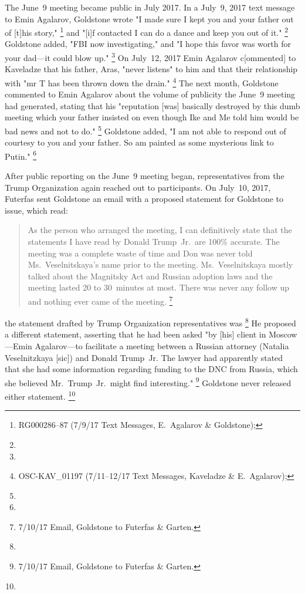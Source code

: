 The June~9 meeting became public in July 2017.
In a July~9, 2017 text message to Emin Agalarov, Goldstone wrote "I made sure I kept you and your father out of [t]his story,"%
\footnote{RG000286--87 (7/9/17 Text Messages, E.~Agalarov \& Goldstone); }
and "[i]f contacted I can do a dance and keep you out of it."%
\footnote{}
Goldstone added, "FBI now investigating," and "I hope this favor was worth for your dad---it could blow up."%
\footnote{ }
On July~12, 2017 Emin Agalarov c[ommented] to Kaveladze that his father, Aras, "never listens" to him and that their relationship with "mr T has been thrown down the drain."%
\footnote{OSC-KAV\_01197 (7/11--12/17 Text Messages, Kaveladze \& E.~Agalarov); }
The next month, Goldstone commented to Emin Agalarov about the volume of publicity the June~9 meeting had generated, stating that his "reputation [was] basically destroyed by this dumb meeting which your father insisted on even though Ike and Me told him would be bad news and not to do."%
\footnote{}
Goldstone added, "I am not able to respond out of courtesy to you and your father.
So am painted as some mysterious link to Putin."%
\footnote{}

After public reporting on the June~9 meeting began, representatives from the Trump Organization again reached out to participants.
On July~10, 2017, Futerfas sent Goldstone an email with a proposed statement for Goldstone to issue, which read:

\begin{quote}
As the person who arranged the meeting, I can definitively state that the statements I have read by Donald Trump~Jr.\ are 100\% accurate.
The meeting was a complete waste of time and Don was never told Ms.~Veselnitskaya's name prior to the meeting.
Ms.~Veselnitskaya mostly talked about the Magnitsky Act and Russian adoption laws and the meeting lasted 20 to 30~minutes at most.
There was never any follow up and nothing ever came of the meeting.%
\footnote{7/10/17 Email, Goldstone to Futerfas \& Garten.}
\end{quote}

the statement drafted by Trump Organization representatives was
\footnote{}
He proposed a different statement, asserting that he had been asked "by [his] client in Moscow---Emin Agalarov---to facilitate a meeting between a Russian attorney (Natalia Veselnitzkaya [sic]) and Donald Trump~Jr.
The lawyer had apparently stated that she had some information regarding funding to the DNC from Russia, which she believed Mr.~Trump~Jr.\ might find interesting."%
\footnote{7/10/17 Email, Goldstone to Futerfas \& Garten.}
Goldstone never released either statement.%
\footnote{}


